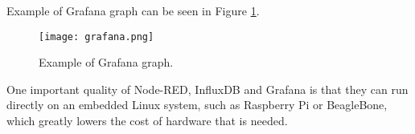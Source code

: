 Example of Grafana graph can be seen in Figure \ref{grafana}.
\newline
\begin{figure}[ht]
    \centering
    \texttt{[image: grafana.png]} 
    \caption{ Example of Grafana graph.}
    \label{grafana}
\end{figure}

One important quality of Node-RED, InfluxDB and Grafana is that they can run directly on an embedded Linux system, such as Raspberry Pi or BeagleBone, which greatly lowers the cost of hardware that is needed.
